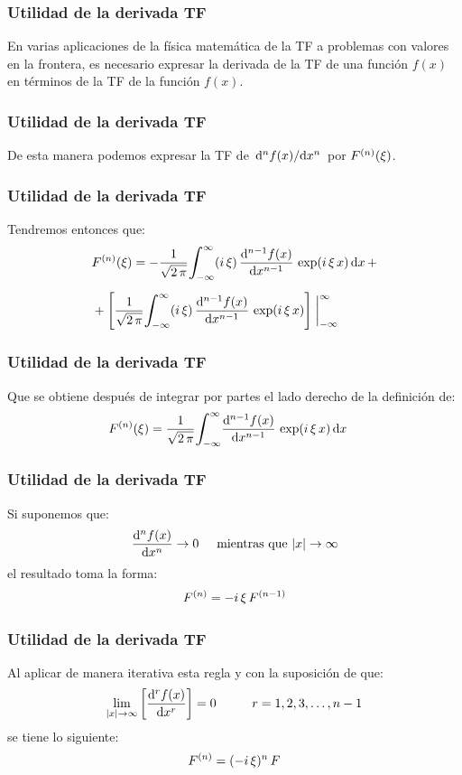 \begin{frame}
\frametitle{Utilidad de la derivada TF}
En varias aplicaciones de la física matemática de la TF a problemas con valores en la frontera, \pause es necesario expresar la derivada de la TF de una función $f (x)$ en términos de la TF de la función $f (x)$.
\end{frame}
\begin{frame}
  \frametitle{Utilidad de la derivada TF}
De esta manera podemos expresar la TF de $\dv*[n]{f (x)}{x}$ por ${F}^{(n)} (\xi)$.
\end{frame}
\begin{frame}
\frametitle{Utilidad de la derivada TF}
Tendremos entonces que:
\pause
\begin{eqnarray*}
\begin{aligned}
&\nderivada{F}{n}(\xi) = -\dfrac{1}{\sqrt{2 \, \pi}} \scaleint{6ex}_{\bs -\infty}^{\infty} (i \, \xi) \, \dv[n-1]{f (x)}{x} \, \exp(i \, \xi \, x) \dd{x} + \\[0.5em]
&+ \left[ \dfrac{1}{\sqrt{2 \, \pi}} \scaleint{6ex}_{\bs -\infty}^{\infty} (i \, \xi) \, \dv[n-1]{f (x)}{x} \, \exp(i \, \xi \, x) \right] \eval_{-\infty}^{\infty}
\end{aligned}
\end{eqnarray*}
\end{frame}
\begin{frame}
\frametitle{Utilidad de la derivada TF}
Que se obtiene después de integrar por partes el lado derecho de la definición de:
\pause
\begin{align}
\nderivada{F}{n}(\xi) &= \dfrac{1}{\sqrt{2 \, \pi}} \scaleint{6ex}_{\bs -\infty}^{\infty} \dv[n-1]{f (x)}{x} \, \exp(i \, \xi \, x) \dd{x}
\label{eq:ecuacion_01_36}
\end{align}
\end{frame}
\begin{frame}
\frametitle{Utilidad de la derivada TF}
Si suponemos que:
\pause
\begin{align*}
\dv[n]{f (x)}{x} \to 0 \hspace{0.5cm} \mbox{mientras que  } \abs{x} \to \infty
\end{align*}
\pause
el resultado toma la forma:
\pause
\begin{align*}
{F}^{(n)} = - i \, \xi \, {F}^{(n-1)}
\end{align*}
\end{frame}
\begin{frame}
\frametitle{Utilidad de la derivada TF}
Al aplicar de manera iterativa esta regla y con la suposición de que:
\pause
\begin{align*}
\lim_{\abs{x} \to \infty} \left[ \dv[r]{f (x)}{x} \right] = 0 \hspace{1cm} r = 1, 2, 3, \ldots, n-1
\end{align*}
\pause
se tiene lo siguiente:
\pause
\begin{align*}
{F}^{(n)} = (- i \, \xi)^{n} \, F
\end{align*}
\end{frame}
